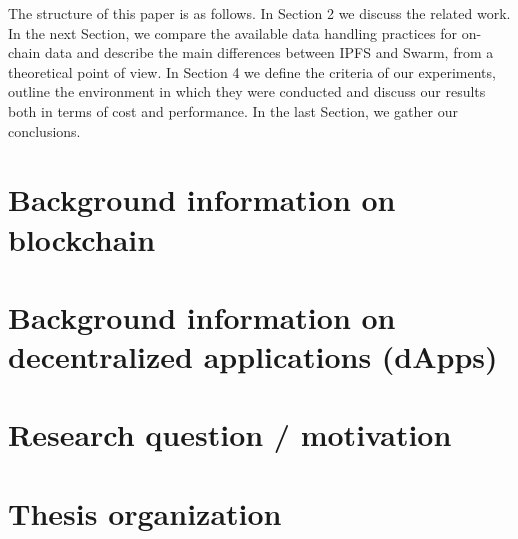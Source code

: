 The structure of this paper is as follows. In Section 2 we discuss the related work. In the next Section, we compare the available data handling practices for on-chain data and describe the main differences between IPFS and Swarm, from a theoretical point of view. In Section 4 we define the criteria of our experiments, outline the environment in which they were conducted and discuss our results both in terms of cost and performance. In the last Section, we gather our conclusions. 

\section{Background information on blockchain}\label{sec:}
\section{Background information on decentralized applications (dApps)}\label{sec:}
\section{Research question / motivation}\label{sec:}
\section{Thesis organization}\label{sec:organization}








